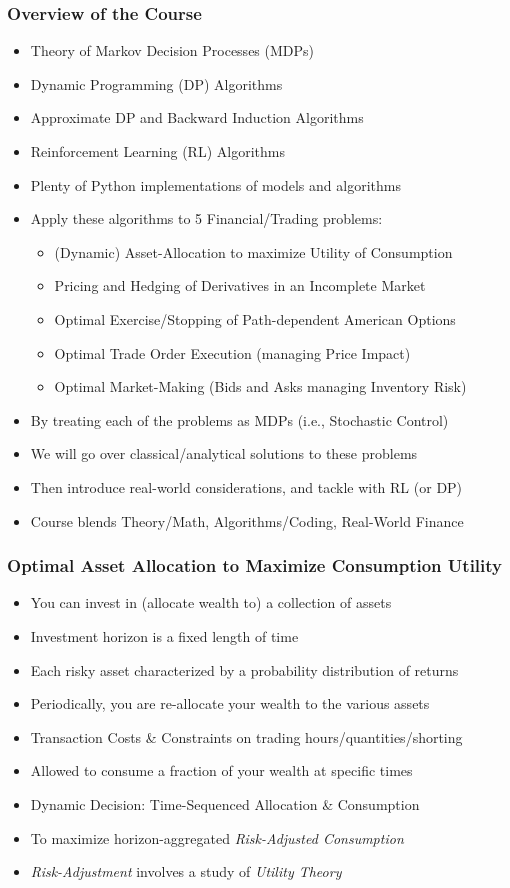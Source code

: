 \documentclass[handout]{beamer}
\begin{document}
\begin{frame}
\frametitle{Overview of the Course}
\pause
\begin{itemize}[<+->]
\item Theory of Markov Decision Processes (MDPs)
\item Dynamic Programming (DP) Algorithms
\item Approximate DP and Backward Induction Algorithms
\item Reinforcement Learning (RL) Algorithms
\item Plenty of Python implementations of models and algorithms
\item Apply these algorithms to 5 Financial/Trading problems:
\begin{itemize}
\item (Dynamic) Asset-Allocation to maximize Utility of Consumption
\item Pricing and Hedging of Derivatives in an Incomplete Market
\item Optimal Exercise/Stopping of Path-dependent American Options
\item Optimal Trade Order Execution (managing Price Impact)
\item Optimal Market-Making (Bids and Asks managing Inventory Risk)
\end{itemize}
\item By treating each of the problems as MDPs (i.e., Stochastic Control)
\item We will go over classical/analytical solutions to these problems
\item Then introduce real-world considerations, and tackle with RL (or DP)
\item Course blends Theory/Math, Algorithms/Coding, Real-World Finance
\end{itemize}
\end{frame}

\begin{frame}
\frametitle{Optimal Asset Allocation to Maximize Consumption Utility}
\pause
\begin{itemize}[<+->]
\item You can invest in (allocate wealth to) a collection of assets
\item Investment horizon is a fixed length of time
\item Each risky asset characterized by a probability distribution of returns
\item Periodically, you are re-allocate your wealth to the various assets
\item Transaction Costs \& Constraints on trading hours/quantities/shorting
\item Allowed to consume a fraction of your wealth at specific times
\item Dynamic Decision: Time-Sequenced Allocation \& Consumption
\item To maximize horizon-aggregated {\em Risk-Adjusted Consumption}
\item {\em Risk-Adjustment} involves a study of {\em Utility Theory}
\end{itemize}
\end{frame}
\end{document}
